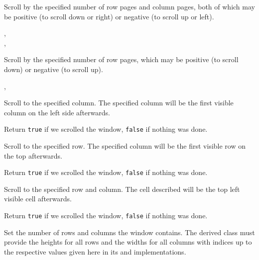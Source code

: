 
Scroll by the specified number of row pages and column pages, both of which may
be positive (to scroll down or right) or negative (to scroll up or left).


,\\
, 


\label{wxhvscrolledwindowscrollrowpages}


Scroll by the specified number of row pages, which may be positive (to scroll
down) or negative (to scroll up).


, 


\label{wxhvscrolledwindowscrolltocolumn}


Scroll to the specified column. The specified column will be the first visible
column on the left side afterwards.

Return {\tt true} if we scrolled the window, {\tt false} if nothing was done.


\label{wxhvscrolledwindowscrolltorow}


Scroll to the specified row. The specified column will be the first visible row
on the top afterwards.

Return {\tt true} if we scrolled the window, {\tt false} if nothing was done.


\label{wxhvscrolledwindowscrolltorowcolumn}


Scroll to the specified row and column. The cell described will be the top left
visible cell afterwards.

Return {\tt true} if we scrolled the window, {\tt false} if nothing was done.


\label{wxhvscrolledwindowsetrowcolumncounts}


Set the number of rows and columns the window contains. The derived class must
provide the heights for all rows and the widths for all columns with indices up
to the respective values given here in its 
 and 
implementations.
